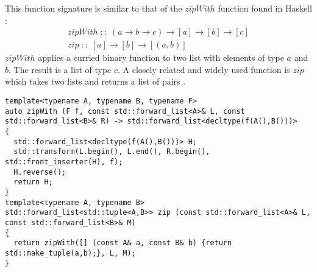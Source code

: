 \documentclass[12pt,fleqn]{article}
\begin{document}
%
This function signature is similar to that of the $zipWith$ function found in Haskell \cite{lipovaca, hutton}:
\begin{eqnarray*}
zipWith \;::\; (a \rightarrow b \rightarrow c ) \rightarrow [a] \rightarrow [b] \rightarrow [c] \\
zip \;::\;  [a] \rightarrow [b] \rightarrow [(a,b)]
\end{eqnarray*}
$zipWith$ applies a curried binary function to two list with elements of type $a$ and $b$.
The result is a list of type $c$.
A closely related and widely used function is $zip$ which takes two lists and returns a list of pairs \cite{zip}.
%
\begin{lstlisting}[caption=zipWith and zip implemented with std::transform, label=zipWith]
template<typename A, typename B, typename F>
auto zipWith (F f, const std::forward_list<A>& L, const std::forward_list<B>& R) -> std::forward_list<decltype(f(A(),B()))>
{
  std::forward_list<decltype(f(A(),B()))> H;
  std::transform(L.begin(), L.end(), R.begin(), std::front_inserter(H), f);
  H.reverse();
  return H;
}
template<typename A, typename B>
std::forward_list<std::tuple<A,B>> zip (const std::forward_list<A>& L, const std::forward_list<B>& M) 
{
  return zipWith([] (const A& a, const B& b) {return std::make_tuple(a,b);}, L, M);
}

\end{lstlisting}
\end{document}
